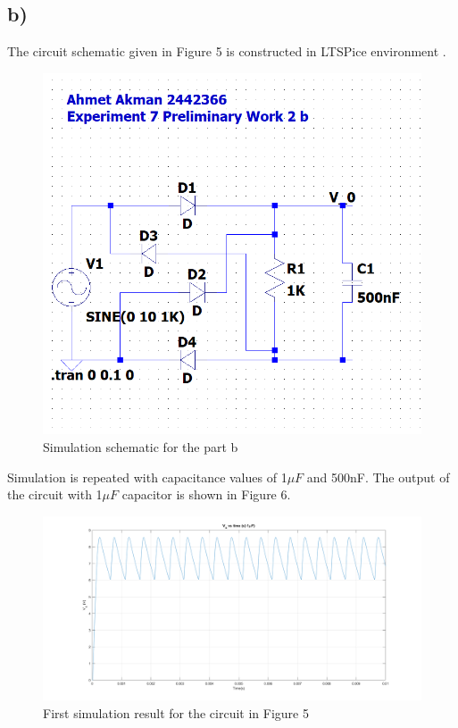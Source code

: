 \documentclass[letterpaper,12pt]{article}
\begin{document}
\subsection{b)}
The circuit schematic given in Figure 5 is constructed in LTSPice environment .
\begin{figure}[H]
	\centering
   \includegraphics[width=1\textwidth]{Pre1b_sch.png}
   \caption{Simulation schematic for the part b}
\end{figure} 

Simulation is repeated with capacitance values of 1\(\mu F\) and 500nF.
The output of the circuit  with 1\(\mu F\) capacitor is shown in Figure   6.
\begin{figure}[H]
	\centering
   \includegraphics[width=1\textwidth]{PRE_2b_1uF.png}
   \caption{First simulation result for the circuit in Figure 5}
\end{figure} 
\end{document}
